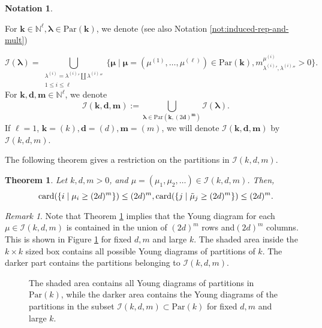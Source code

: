 \documentclass{amsart}
\newtheorem{theorem}{Theorem}
\theoremstyle{definition}
\newtheorem{notation}{Notation}
\theoremstyle{remark}
\newtheorem{remark}{Remark}
\numberwithin{equation}{section}
\begin{document}
\begin{notation}
\label{def:set-of-irred}

For ${\mathbf{k}} \in {\mathbb{N}}^\ell, \pmb{\lambda} \in {\mathrm{Par}}({\mathbf{k}})$, we denote 
(see also Notation \ref{not:induced-rep-and-mult})

\begin{equation}
\label{eqn:set-of-irred-lambda}
\mathcal{I}(\pmb{\lambda}) = 
\bigcup_{\substack{\lambda^{(i)} = {\lambda^{(i)}}' \coprod {\lambda^{(i)}}''\\ 1 \leq i \leq \ell}}
\{
 {\pmb{\mu}} \mid \pmb{\mu} =(\mu^{(1)},\ldots,\mu^{(\ell)})  \in {\mathrm{Par}}({\mathbf{k}}),  
 m^{\mu^{(i)}}_{{\lambda^{(i)}}',{\lambda^{(i)}}''} >0 
\}.
\end{equation}
For ${\mathbf{k}},{\mathbf{d}} ,{\mathbf{m}}\in {\mathbb{N}}^\ell$, we denote
\begin{equation}
\label{eqn:set-of-irred}
\mathcal{I}({\mathbf{k}},{\mathbf{d}},{\mathbf{m}}) :=
\bigcup_{\pmb{\lambda}  \in {\mathrm{Par}}({\mathbf{k}}, (2{\mathbf{d}})^{\mathbf{m}})} \mathcal{I}(\pmb{\lambda}).
\end{equation}
If $\ell=1$, ${\mathbf{k}}=(k),{\mathbf{d}}= (d),{\mathbf{m}}=(m)$, we will denote $\mathcal{I}({\mathbf{k}},{\mathbf{d}},{\mathbf{m}})$ by
$\mathcal{I}(k,d,m)$.
\end{notation}

The following theorem gives a restriction on the partitions in  $\mathcal{I}(k,d,m)$.

\begin{theorem}
\label{thm:restriction}
Let $k,d,m > 0$, and $\mu=(\mu_1,\mu_2,\ldots) \in  \mathcal{I}(k,d,m)$.
Then,
\[
{\mathrm{card}}(\{ i \mid \mu_i \geq (2d)^m \}) \leq (2d)^m, \\
{\mathrm{card}}(\{j \mid \tilde{\mu}_j \geq (2d)^m\}) \leq (2d)^m.
\]
\end{theorem}

\begin{remark}
\label{rem:restriction}
Note that Theorem \ref{thm:restriction} implies that the Young diagram for each  $\mu \in \mathcal{I}(k,d,m)$ is contained in the union of $(2d)^m$ rows and$(2d)^m$ columns. This is shown in Figure
\ref{fig:young} for fixed $d,m$ and large $k$. 
The shaded area inside the $k \times k$ sized box contains all possible Young diagrams of
partitions of $k$. The darker part contains the partitions belonging to $\mathcal{I}(k,d,m)$.

\begin{figure}

\caption{The shaded area contains all Young diagrams of partitions in ${\mathrm{Par}}(k)$, while the darker area contains the Young diagrams of the partitions in the subset $\mathcal{I}(k,d,m)\subset {\mathrm{Par}}(k)$ for fixed $d,m$ and large $k$.}
\label{fig:young}
\end{figure}
\end{remark}
\end{document}
